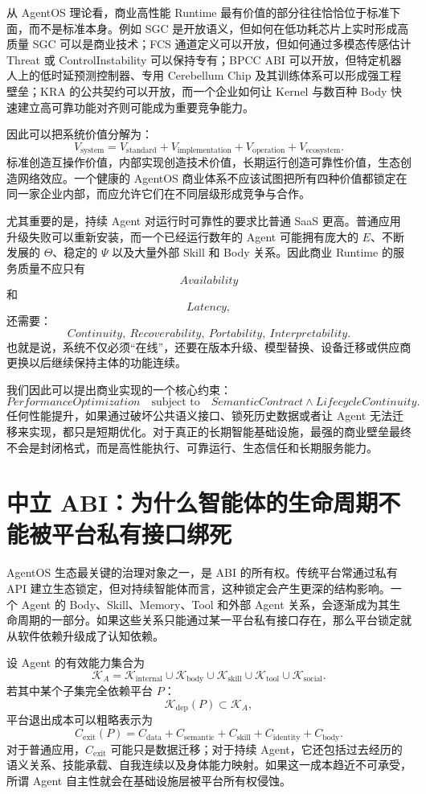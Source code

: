 从 AgentOS 理论看，商业高性能 Runtime 最有价值的部分往往恰恰位于标准下面，而不是标准本身。例如 SGC 是开放语义，但如何在低功耗芯片上实时形成高质量 SGC 可以是商业技术；FCS 通道定义可以开放，但如何通过多模态传感估计 Threat 或 ControlInstability 可以保持专有；BPCC ABI 可以开放，但特定机器人上的低时延预测控制器、专用 Cerebellum Chip 及其训练体系可以形成强工程壁垒；KRA 的公共契约可以开放，而一个企业如何让 Kernel 与数百种 Body 快速建立高可靠功能对齐则可能成为重要竞争能力。

因此可以把系统价值分解为：
\[
V_{\mathrm{system}}
=
V_{\mathrm{standard}}
+
V_{\mathrm{implementation}}
+
V_{\mathrm{operation}}
+
V_{\mathrm{ecosystem}}.
\]
标准创造互操作价值，内部实现创造技术价值，长期运行创造可靠性价值，生态创造网络效应。一个健康的 AgentOS 商业体系不应该试图把所有四种价值都锁定在同一家企业内部，而应允许它们在不同层级形成竞争与合作。

尤其重要的是，持续 Agent 对运行时可靠性的要求比普通 SaaS 更高。普通应用升级失败可以重新安装，而一个已经运行数年的 Agent 可能拥有庞大的 $E$、不断发展的 $\Theta$、稳定的 $\Psi$ 以及大量外部 Skill 和 Body 关系。因此商业 Runtime 的服务质量不应只有
\[
Availability
\]
和
\[
Latency,
\]
还需要：
\[
\boxed{
Continuity,\ Recoverability,\ Portability,\ Interpretability.
}
\]
也就是说，系统不仅必须``在线''，还要在版本升级、模型替换、设备迁移或供应商更换以后继续保持主体的功能连续。

我们因此可以提出商业实现的一个核心约束：
\[
\boxed{
PerformanceOptimization
\quad
\text{subject to}
\quad
SemanticContract\land LifecycleContinuity.
}
\]
任何性能提升，如果通过破坏公共语义接口、锁死历史数据或者让 Agent 无法迁移来实现，都只是短期优化。对于真正的长期智能基础设施，最强的商业壁垒最终不会是封闭格式，而是高性能执行、可靠运行、生态信任和长期服务能力。

\section{中立 ABI：为什么智能体的生命周期不能被平台私有接口绑死}

AgentOS 生态最关键的治理对象之一，是 ABI 的所有权。传统平台常通过私有 API 建立生态锁定，但对持续智能体而言，这种锁定会产生更深的结构影响。一个 Agent 的 Body、Skill、Memory、Tool 和外部 Agent 关系，会逐渐成为其生命周期的一部分。如果这些关系只能通过某一平台私有接口存在，那么平台锁定就从软件依赖升级成了认知依赖。

设 Agent 的有效能力集合为
\[
\mathcal K_A
=
\mathcal K_{\mathrm{internal}}
\cup
\mathcal K_{\mathrm{body}}
\cup
\mathcal K_{\mathrm{skill}}
\cup
\mathcal K_{\mathrm{tool}}
\cup
\mathcal K_{\mathrm{social}}.
\]
若其中某个子集完全依赖平台 $P$：
\[
\mathcal K_{\mathrm{dep}}(P)
\subset
\mathcal K_A,
\]
平台退出成本可以粗略表示为
\[
C_{\mathrm{exit}}(P)
=
C_{\mathrm{data}}
+
C_{\mathrm{semantic}}
+
C_{\mathrm{skill}}
+
C_{\mathrm{identity}}
+
C_{\mathrm{body}}.
\]
对于普通应用，$C_{\mathrm{exit}}$ 可能只是数据迁移；对于持续 Agent，它还包括过去经历的语义关系、技能承载、自我连续以及身体能力映射。如果这一成本趋近不可承受，所谓 Agent 自主性就会在基础设施层被平台所有权侵蚀。

